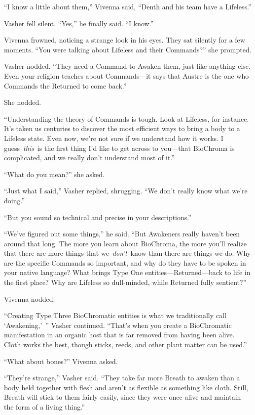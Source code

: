 “I know a little about them,” Vivenna said, “Denth and his team have a Lifeless.”

Vasher fell silent. “Yes,” he finally said. “I know.”

Vivenna frowned, noticing a strange look in his eyes. They sat silently for a few moments. “You were talking about Lifeless and their Commands?” she prompted.

Vasher nodded. “They need a Command to Awaken them, just like anything else. Even your religion teaches about Commands—it says that Austre is the one who Commands the Returned to come back.”

She nodded.

“Understanding the theory of Commands is tough. Look at Lifeless, for instance. It’s taken us centuries to discover the most efficient ways to bring a body to a Lifeless state. Even now, we’re not sure if we understand how it works. I guess~\textit{this}~is the first thing I’d like to get across to you—that BioChroma is complicated, and we really don’t understand most of it.”

“What do you mean?” she asked.

“Just what I said,” Vasher replied, shrugging. “We don’t really know what we’re doing.”

“But you sound so technical and precise in your descriptions.”

“We’ve figured out some things,” he said. “But Awakeners really haven’t been around that long. The more you learn about BioChroma, the more you’ll realize that there are more things that we~\textit{don’t}~know than there are things we do. Why are the specific Commands so important, and why do they have to be spoken in your native language? What brings Type One entities—Returned—back to life in the first place? Why are Lifeless so dull-minded, while Returned fully sentient?”

Vivenna nodded.

“Creating Type Three BioChromatic entities is what we traditionally call ‘Awakening,’~” Vasher continued. “That’s when you create a BioChromatic manifestation in an organic host that is far removed from having been alive. Cloth works the best, though sticks, reeds, and other plant matter can be used.”

“What about bones?” Vivenna asked.

“They’re strange,” Vasher said. “They take far more Breath to awaken than a body held together with flesh and aren’t as flexible as something like cloth. Still, Breath will stick to them fairly easily, since they were once alive and maintain the form of a living thing.”

